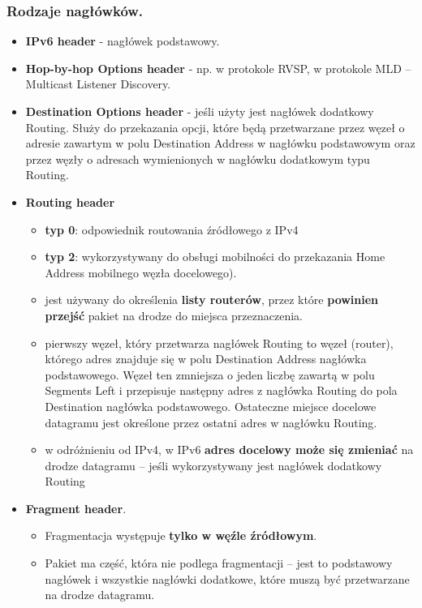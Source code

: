 \documentclass[../main.tex]{subfiles}
\begin{document}
    \subsubsection{Rodzaje nagłówków.}
    \begin{itemize}
        \item \textbf{IPv6 header} - nagłówek podstawowy.
        \item \textbf{Hop-by-hop Options header} - np. w protokole RVSP, w protokole MLD – Multicast Listener Discovery.
        \item \textbf{Destination Options header} - jeśli użyty jest nagłówek dodatkowy Routing. Służy do przekazania opcji, które będą przetwarzane przez węzeł o adresie zawartym w polu Destination Address w nagłówku podstawowym oraz przez węzły o adresach wymienionych w nagłówku dodatkowym typu Routing.
        \item \textbf{Routing header}
        \begin{itemize}
            \item \textbf{typ 0}: odpowiednik routowania źródłowego z IPv4
            \item \textbf{typ 2}: wykorzystywany do obsługi mobilności do przekazania Home Address mobilnego węzła docelowego).
            \item jest używany do określenia \textbf{listy routerów}, przez które \textbf{powinien przejść} pakiet na drodze do miejsca przeznaczenia.
            \item pierwszy węzeł, który przetwarza nagłówek Routing to węzeł (router), którego adres znajduje się w polu Destination Address nagłówka podstawowego. Węzeł ten zmniejsza o jeden liczbę zawartą w polu Segments Left i przepisuje następny adres z nagłówka Routing do pola Destination nagłówka podstawowego. Ostateczne miejsce docelowe datagramu jest określone przez ostatni adres w nagłówku Routing.
            \item w odróżnieniu od IPv4, w IPv6 \textbf{adres docelowy może się zmieniać} na drodze datagramu – jeśli wykorzystywany jest nagłówek dodatkowy Routing
        \end{itemize}
        \item \textbf{Fragment header}.
        \begin{itemize}
            \item Fragmentacja występuje \textbf{tylko w węźle źródłowym}.
            \item Pakiet ma część, która nie podlega fragmentacji – jest to podstawowy nagłówek i wszystkie nagłówki dodatkowe, które muszą być przetwarzane na drodze datagramu.

\end{itemize}
\end{itemize}
\end{document}
